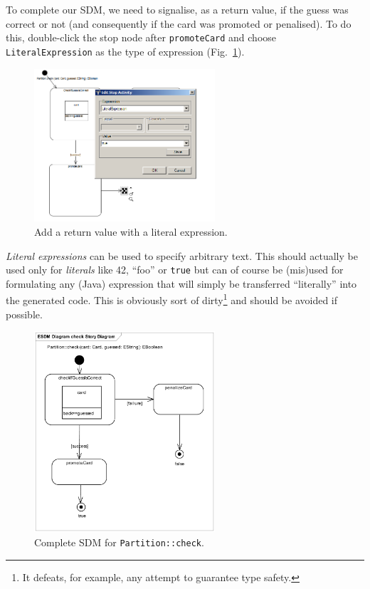 To complete our SDM, we need to signalise, as a return value, if the guess was
correct or not (and consequently if the card was promoted or penalised).  To do
this, double-click the stop node after \texttt{promoteCard} and choose
\texttt{LiteralExpression} as the type of expression
(Fig.~\ref{fig:sdm_check_literal_exp}).  

\begin{figure}[htbp]
\begin{center}
  \includegraphics[width=0.6\textwidth]{pics/sdmBilder/check/sdm39}
  \caption{Add a return value with a literal expression.}  
  \label{fig:sdm_check_literal_exp}
\end{center}
\end{figure}

\clearpage

\emph{Literal expressions} can be used
to specify arbitrary text.  This should actually be used only for
\emph{literals} like 42, ``foo'' or \texttt{true} but can of course be (mis)used
for formulating any (Java) expression that will simply be transferred
``literally'' into the  generated code. This is obviously sort of
dirty\footnote{It defeats, for example, any attempt to guarantee type safety.} 
and should be avoided if possible.
  
\begin{figure}[htbp]
\begin{center}
  \includegraphics[width=0.6\textwidth]{pics/sdmBilder/check/sdm40}
  \caption{Complete SDM for \texttt{Partition::check}.}  
  \label{fig:sdm_check_finish}
\end{center}
\end{figure}

